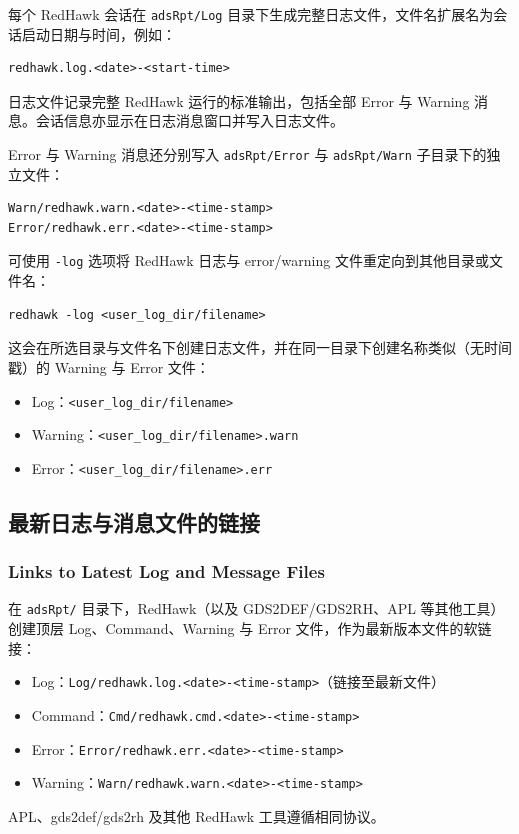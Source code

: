 每个 RedHawk 会话在 \texttt{adsRpt/Log} 目录下生成完整日志文件，文件名扩展名为会话启动日期与时间，例如：
\begin{lstlisting}
redhawk.log.<date>-<start-time>
\end{lstlisting}
日志文件记录完整 RedHawk 运行的标准输出，包括全部 Error 与 Warning 消息。会话信息亦显示在日志消息窗口并写入日志文件。

Error 与 Warning 消息还分别写入 \texttt{adsRpt/Error} 与 \texttt{adsRpt/Warn} 子目录下的独立文件：
\begin{lstlisting}
Warn/redhawk.warn.<date>-<time-stamp>
Error/redhawk.err.<date>-<time-stamp>
\end{lstlisting}
可使用 \texttt{-log} 选项将 RedHawk 日志与 error/warning 文件重定向到其他目录或文件名：
\begin{lstlisting}
redhawk -log <user_log_dir/filename>
\end{lstlisting}
这会在所选目录与文件名下创建日志文件，并在同一目录下创建名称类似（无时间戳）的 Warning 与 Error 文件：
\begin{itemize}
  \item Log：\texttt{<user\_log\_dir/filename>}
  \item Warning：\texttt{<user\_log\_dir/filename>.warn}
  \item Error：\texttt{<user\_log\_dir/filename>.err}
\end{itemize}

\subsection{最新日志与消息文件的链接}
\subsubsection*{Links to Latest Log and Message Files}

在 \texttt{adsRpt/} 目录下，RedHawk（以及 GDS2DEF/GDS2RH、APL 等其他工具）创建顶层 Log、Command、Warning 与 Error 文件，作为最新版本文件的软链接：
\begin{itemize}
  \item Log：\texttt{Log/redhawk.log.<date>-<time-stamp>}（链接至最新文件）
  \item Command：\texttt{Cmd/redhawk.cmd.<date>-<time-stamp>}
  \item Error：\texttt{Error/redhawk.err.<date>-<time-stamp>}
  \item Warning：\texttt{Warn/redhawk.warn.<date>-<time-stamp>}
\end{itemize}
APL、gds2def/gds2rh 及其他 RedHawk 工具遵循相同协议。

